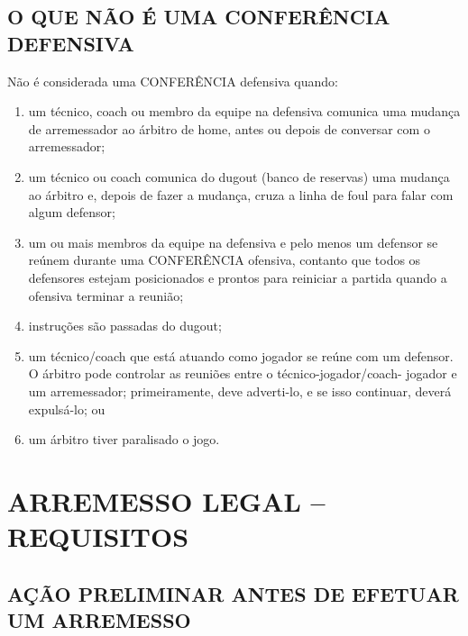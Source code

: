 \subsection{O QUE NÃO É UMA CONFERÊNCIA DEFENSIVA}

Não é considerada uma CONFERÊNCIA defensiva quando:

\begin{enumerate}[label=(\alph*)]
	\item   um técnico, \gls{coach} ou membro da equipe na defensiva comunica uma  mudança de arremessador ao árbitro de \gls{home}, antes ou depois de conversar com o arremessador;
	\item  um técnico ou \gls{coach} comunica do \gls{dugout} (banco de reservas) uma mudança ao árbitro e, depois de fazer a mudança, cruza a linha de \gls{foul} para  falar com algum defensor;
	\item  um ou mais membros da equipe na defensiva e pelo menos um defensor se reúnem durante uma CONFERÊNCIA ofensiva, contanto que todos os
	defensores estejam posicionados e prontos para reiniciar a partida quando a  ofensiva terminar a reunião;
	\item  instruções são passadas do \gls{dugout};
	\item  um técnico/\gls{coach} que está atuando como jogador se reúne com um defensor. O árbitro pode controlar as reuniões entre o técnico-jogador/\gls{coach}- jogador e um arremessador; primeiramente, deve adverti-lo, e se isso continuar, deverá expulsá-lo; ou
	\item  um árbitro tiver paralisado o jogo.
\end{enumerate}
\section{ARREMESSO LEGAL -- REQUISITOS}
\subsection{AÇÃO PRELIMINAR  ANTES  DE  EFETUAR  UM ARREMESSO}


